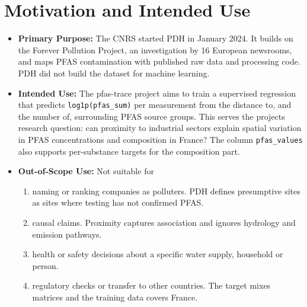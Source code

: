 \documentclass[11pt, a4paper]{article}
\newcommand{\code}[1]{\texttt{#1}}
\begin{document}
\section{Motivation and Intended Use}
\begin{itemize}
    \item \textbf{Primary Purpose:} The CNRS started PDH in January 2024. It builds on the Forever Pollution Project, an investigation by 16 European newsrooms, and maps PFAS contamination with published raw data and processing code. PDH did not build the dataset for machine learning.
    \item \textbf{Intended Use:} The pfas-trace project aims to train a supervised regression that predicts \code{log1p(pfas\_sum)} per measurement from the distance to, and the number of, surrounding PFAS source groups. This serves the projects research question: can proximity to industrial sectors explain spatial variation in PFAS concentrations and composition in France? The column \code{pfas\_values} also supports per-substance targets for the composition part.
    \item \textbf{Out-of-Scope Use:} Not suitable for
    \begin{enumerate}
        \item naming or ranking companies as polluters. PDH defines presumptive sites as sites where testing has not confirmed PFAS.
        \item causal claims. Proximity captures association and ignores hydrology and emission pathways.
        \item health or safety decisions about a specific water supply, household or person.
        \item regulatory checks or transfer to other countries. The target mixes matrices and the training data covers France.
    \end{enumerate}
\end{itemize}

\end{document}
